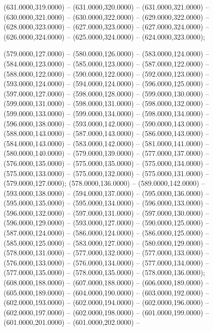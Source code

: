 \begin{scope}[shift={(-231.87,-121.87)}]
\begin{scope}[draw=black,fill=cd7191c,line join=round,line width=0.208pt]
        (631.0000,319.0000) -- (631.0000,320.0000) -- (631.0000,321.0000) --
        (630.0000,321.0000) -- (630.0000,322.0000) -- (629.0000,322.0000) --
        (628.0000,323.0000) -- (627.0000,323.0000) -- (627.0000,324.0000) --
        (626.0000,324.0000) -- (625.0000,324.0000) -- (624.0000,323.0000);
  \end{scope}
  \begin{scope}[draw=black,fill=cfdae61,line join=round,line width=0.208pt]
       (579.0000,127.0000) -- (580.0000,126.0000) --
        (583.0000,124.0000) -- (584.0000,123.0000) -- (585.0000,123.0000) --
        (587.0000,122.0000) -- (588.0000,122.0000) -- (590.0000,122.0000) --
        (592.0000,123.0000) -- (593.0000,124.0000) -- (594.0000,124.0000) --
        (596.0000,125.0000) -- (597.0000,127.0000) -- (598.0000,128.0000) --
        (599.0000,130.0000) -- (599.0000,131.0000) -- (598.0000,131.0000) --
        (598.0000,132.0000) -- (599.0000,133.0000) -- (599.0000,134.0000) --
        (598.0000,134.0000) -- (596.0000,138.0000) -- (593.0000,142.0000) --
        (590.0000,143.0000) -- (588.0000,143.0000) -- (587.0000,143.0000) --
        (586.0000,143.0000) -- (584.0000,143.0000) -- (583.0000,142.0000) --
        (581.0000,141.0000) -- (580.0000,140.0000) -- (579.0000,139.0000) --
        (577.0000,137.0000) -- (576.0000,135.0000) -- (575.0000,135.0000) --
        (575.0000,134.0000) -- (575.0000,133.0000) -- (575.0000,132.0000) --
        (575.0000,131.0000) -- (579.0000,127.0000);
       (578.0000,136.0000) -- (589.0000,142.0000) --
        (593.0000,138.0000) -- (594.0000,137.0000) -- (595.0000,136.0000) --
        (595.0000,135.0000) -- (595.0000,134.0000) -- (596.0000,133.0000) --
        (596.0000,132.0000) -- (597.0000,131.0000) -- (597.0000,130.0000) --
        (596.0000,129.0000) -- (593.0000,127.0000) -- (590.0000,125.0000) --
        (587.0000,124.0000) -- (586.0000,124.0000) -- (586.0000,125.0000) --
        (585.0000,125.0000) -- (583.0000,127.0000) -- (580.0000,129.0000) --
        (578.0000,131.0000) -- (577.0000,132.0000) -- (577.0000,133.0000) --
        (576.0000,133.0000) -- (576.0000,134.0000) -- (577.0000,134.0000) --
        (577.0000,135.0000) -- (578.0000,135.0000) -- (578.0000,136.0000);
       (608.0000,188.0000) -- (607.0000,188.0000) --
        (606.0000,189.0000) -- (605.0000,189.0000) -- (604.0000,190.0000) --
        (603.0000,192.0000) -- (602.0000,193.0000) -- (602.0000,194.0000) --
        (602.0000,196.0000) -- (602.0000,197.0000) -- (602.0000,198.0000) --
        (601.0000,199.0000) -- (601.0000,201.0000) -- (601.0000,202.0000) --

\end{scope}
\end{scope}
